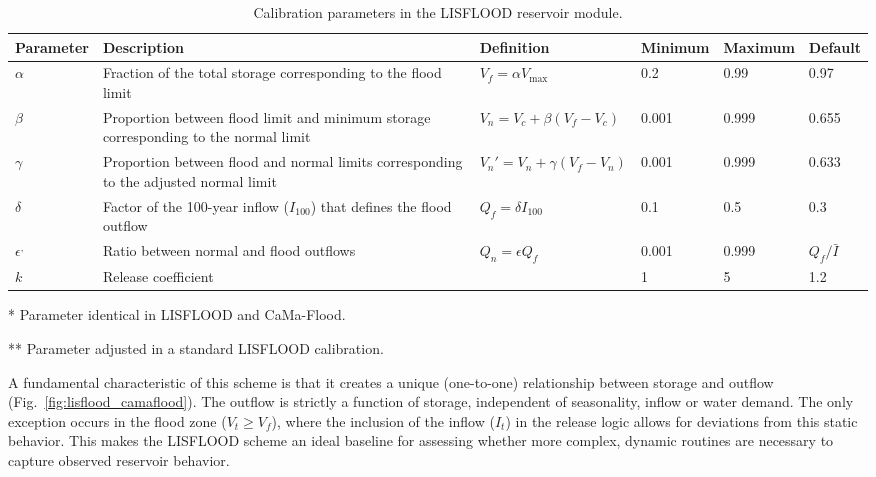\documentclass[hess, manuscript]{copernicus}
\begin{document}
\begin{table}[t]
    \centering
    \begin{threeparttable}
        \caption{Calibration parameters in the LISFLOOD reservoir module.}
        \label{tab:parameters_lisflood}
        \begin{tabularx}{\textwidth}{lXllll}
            \toprule
            \textbf{Parameter} & \textbf{Description} & \textbf{Definition} & \textbf{Minimum} & \textbf{Maximum} & \textbf{Default} \\
            \midrule
            $\alpha$\tnote{*} & Fraction of the total storage corresponding to the flood limit & $V_f = \alpha V_{\max}$ & 0.2 & 0.99 & 0.97 \\
            $\beta$ & Proportion between flood limit and minimum storage corresponding to the normal limit & $V_n = V_c + \beta (V_f - V_c)$ & 0.001 & 0.999 & 0.655 \\
            $\gamma$\tnote{**} & Proportion between flood and normal limits corresponding to the adjusted normal limit & $V_n' = V_n + \gamma (V_f - V_n)$ & 0.001 & 0.999 & 0.633 \\
            $\delta$\tnote{*} & Factor of the 100-year inflow ($I_{100}$) that defines the flood outflow & $Q_f = \delta I_{100}$ & 0.1 & 0.5 & 0.3 \\
            $\epsilon$\tnote{*}$^,$\tnote{**} & Ratio between normal and flood outflows & $Q_n = \epsilon Q_f$ & 0.001 & 0.999 & $Q_f / \bar{I}$ \\
            $k$ & Release coefficient & & 1 & 5 & 1.2 \\
             \bottomrule
        \end{tabularx}
        \begin{tablenotes}
            \small
            \item{*} Parameter identical in LISFLOOD and CaMa-Flood.
            \item{**} Parameter adjusted in a standard LISFLOOD calibration.
        \end{tablenotes}
    \end{threeparttable}
\end{table}

A fundamental characteristic of this scheme is that it creates a unique (one-to-one) relationship between storage and outflow (Fig.~\ref{fig:lisflood_camaflood}). The outflow is strictly a function of storage, independent of seasonality, inflow or water demand. The only exception occurs in the flood zone ($V_t \geq V_f$), where the inclusion of the inflow ($I_t$) in the release logic allows for deviations from this static behavior. This makes the LISFLOOD scheme an ideal baseline for assessing whether more complex, dynamic routines are necessary to capture observed reservoir behavior.
\end{document}
